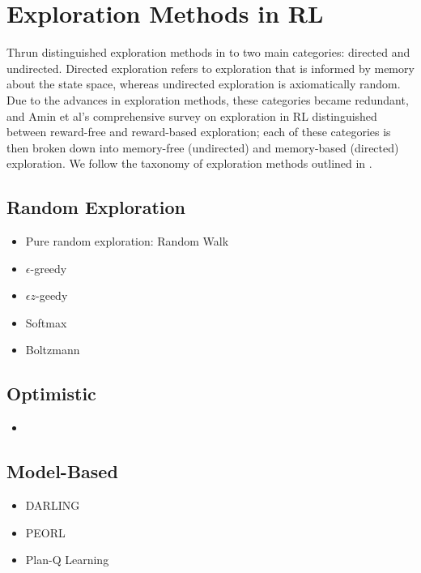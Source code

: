 \section{Exploration Methods in RL}
Thrun \cite{Thrun-1992-15850} distinguished exploration methods in to two main categories: directed and undirected. Directed exploration refers to exploration that is informed by memory about the state space, whereas undirected exploration is axiomatically random. Due to the advances in exploration methods, these categories became redundant, and Amin et al's \cite{DBLP:journals/corr/abs-2109-00157} comprehensive survey on exploration in RL distinguished between reward-free and reward-based exploration; each of these categories is then broken down into memory-free (undirected) and memory-based (directed) exploration. We follow the taxonomy of exploration methods outlined in \cite{DBLP:journals/corr/abs-2109-00157}.
\subsection{Random Exploration}
\begin{itemize}
    \item Pure random exploration: Random Walk
    \item $\epsilon$-greedy \cite{Watkins:1989, conf/nips/Sutton95}
    \item $\epsilon z$-geedy \cite{dabney2021temporallyextended, SUTTON1999181}
    \item Softmax
    \item Boltzmann \cite{Watkins:1989, 10.1007/BF00992699, SCC.Barto.Bradtke.ea1991}
\end{itemize}
\subsection{Optimistic}
\begin{itemize}
    \item
\end{itemize}
\subsection{Model-Based}
\begin{itemize}
    \item DARLING \cite{AIJ16-leonetti}
    \item PEORL \cite{DBLP:journals/corr/abs-1804-07779}
    \item Plan-Q Learning \cite{10.1007/978-3-540-77949-0_6}
    \cite{DBLP:journals/corr/abs-2006-15009}
\end{itemize}



